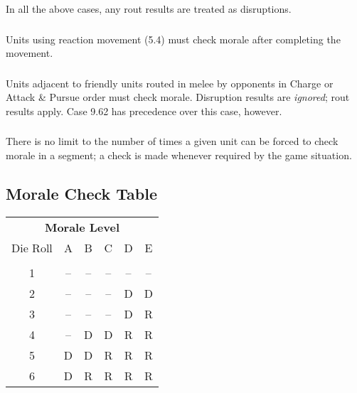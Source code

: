 In all the above cases, any rout results are treated as disruptions.

\subsubsection[Reaction Movement]{} Units using reaction movement (5.4) must check morale after completing the movement.

\subsubsection[Adjacent Units]{} Units adjacent to friendly units routed in melee by opponents in Charge or Attack \& Pursue order must check morale. Disruption results are \textit{ignored}; rout results apply. Case 9.62 has precedence over this case, however.

\subsubsection[No Limits]{} There is no limit to the number of times a given unit can be forced to check morale in a segment; a check is made whenever required by the game situation.

\subsection{Morale Check Table}

\begin{center}
\begin{tabular}{ cccccc }
    \multicolumn{6}{c}{ \textbf{Morale Level}} \\
    Die Roll & A & B & C & D & E \\
    \hline \\ [-2.0ex]
    1 & -- & -- & -- & -- & -- \\
    2 & -- & -- & -- & D & D \\
    3 & -- & -- & -- & D & R \\
    4 & -- & D & D & R & R \\
    5 & D & D & R & R & R \\
    6 & D & R & R & R & R \\
    \hline
\end{tabular}
\end{center}